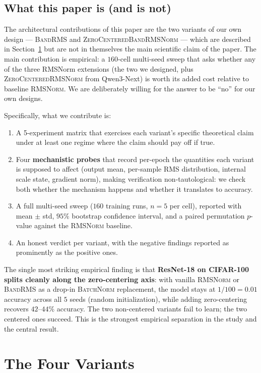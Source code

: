 \documentclass{article}
\newcommand{\rms}{\textsc{RMSNorm}}
\newcommand{\bandrms}{\textsc{BandRMS}}
\newcommand{\zcrms}{\textsc{ZeroCentered}\-\textsc{RMSNorm}}
\newcommand{\zcband}{\textsc{ZeroCentered}\-\textsc{BandRMSNorm}}
\newcommand{\batchnorm}{\textsc{BatchNorm}}
\begin{document}
\subsection{What this paper is (and is not)}

The architectural contributions of this paper are the two variants of our own design --- \bandrms{} and \zcband{} --- which are described in Section~\ref{sec:variants} but are not in themselves the main scientific claim of the paper.
The main contribution is empirical: a $160$-cell multi-seed sweep that asks whether any of the three RMSNorm extensions (the two we designed, plus \zcrms{} from Qwen3-Next) is worth its added cost relative to baseline \rms{}.
We are deliberately willing for the answer to be ``no'' for our own designs.

Specifically, what we contribute is:
\begin{enumerate}
  \item A 5-experiment matrix that exercises each variant's specific theoretical claim under at least one regime where the claim should pay off if true.
  \item Four \textbf{mechanistic probes} that record per-epoch the quantities each variant is supposed to affect (output mean, per-sample RMS distribution, internal scale state, gradient norm), making verification non-tautological: we check both whether the mechanism happens and whether it translates to accuracy.
  \item A full multi-seed sweep ($160$ training runs, $n{=}5$ per cell), reported with mean $\pm$ std, $95\%$ bootstrap confidence interval, and a paired permutation $p$-value against the \rms{} baseline.
  \item An honest verdict per variant, with the negative findings reported as prominently as the positive ones.
\end{enumerate}

The single most striking empirical finding is that \textbf{ResNet-18 on CIFAR-100 splits cleanly along the zero-centering axis}: with vanilla \rms{} or \bandrms{} as a drop-in \batchnorm{} replacement, the model stays at $1/100 = 0.01$ accuracy across all $5$ seeds (random initialization), while adding zero-centering recovers $42$--$44\%$ accuracy.
The two non-centered variants fail to learn; the two centered ones succeed.
This is the strongest empirical separation in the study and the central result.

\section{The Four Variants}
\label{sec:variants}
\end{document}
